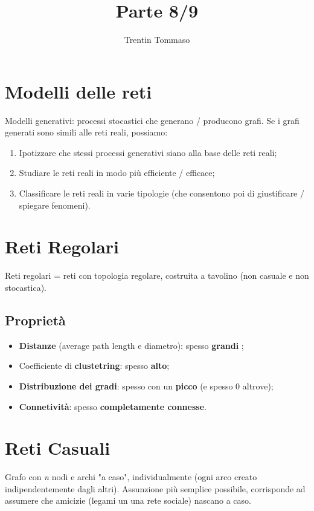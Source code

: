 \documentclass{article}
\title{Parte 8/9}
\author{Trentin Tommaso}
\begin{document}
  \section{Modelli delle reti}
    Modelli generativi: processi stocastici che generano / producono grafi. Se i grafi generati sono simili alle reti reali, possiamo:
    \begin{enumerate}
      \item Ipotizzare che stessi processi generativi siano alla base delle reti reali;
      \item Studiare le reti reali in modo più efficiente / efficace;
      \item Classificare le reti reali in varie tipologie (che consentono poi di giustificare / spiegare fenomeni). 
    \end{enumerate}
  \section{Reti Regolari}
    Reti regolari = reti con topologia regolare, costruita a tavolino (non casuale e non stocastica).
    \subsection{Proprietà}
      \begin{itemize}
        \item \textbf{Distanze} (average path length e diametro): spesso \textbf{grandi };
        \item Coefficiente di \textbf{clustetring}: spesso \textbf{alto};
        \item \textbf{Distribuzione dei gradi}: spesso con un \textbf{picco} (e spesso 0 altrove);
        \item \textbf{Connetività}: spesso \textbf{completamente connesse}.
      \end{itemize}
  \section{Reti Casuali}
    Grafo con \textit{n} nodi e archi "a caso", individualmente (ogni arco creato indipendentemente dagli altri). Assunzione più semplice possibile, corrisponde ad assumere che amicizie (legami un una rete sociale) nascano a caso.
\end{document}
